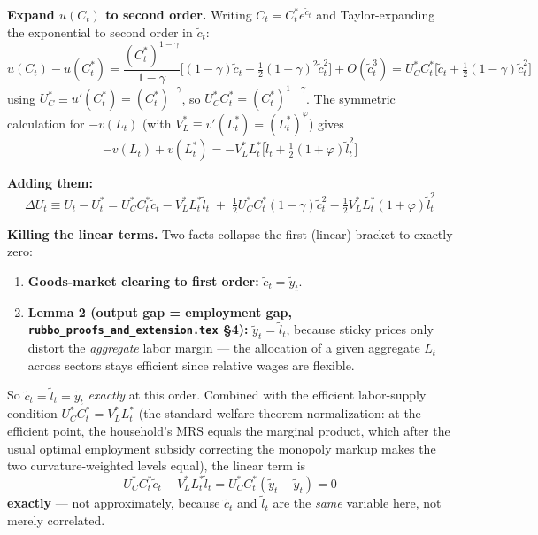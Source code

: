 \documentclass[12pt]{article}
\begin{document}
\textbf{Expand $u(C_t)$ to second order.} Writing $C_t = C_t^* e^{\tilde c_t}$ and Taylor-expanding
the exponential to second order in $\tilde c_t$:
\begin{equation}
    u(C_t) - u(C_t^*) = \frac{(C_t^*)^{1-\gamma}}{1-\gamma}\Big[(1-\gamma)\tilde c_t + \tfrac{1}{2}(1-\gamma)^2\tilde c_t^2\Big] + O(\tilde c_t^3)
    = U_C^*C_t^*\Big[\tilde c_t + \tfrac{1}{2}(1-\gamma)\tilde c_t^2\Big]
\end{equation}
using $U_C^* \equiv u'(C_t^*) = (C_t^*)^{-\gamma}$, so $U_C^*C_t^* = (C_t^*)^{1-\gamma}$. The
symmetric calculation for $-v(L_t)$ (with $V_L^* \equiv v'(L_t^*) = (L_t^*)^\varphi$) gives
\begin{equation}
    -v(L_t) + v(L_t^*) = -V_L^*L_t^*\Big[\tilde l_t + \tfrac{1}{2}(1+\varphi)\tilde l_t^2\Big]
\end{equation}

\textbf{Adding them:}
\begin{equation}
    \Delta U_t \equiv U_t - U_t^* = U_C^*C_t^*\tilde c_t - V_L^*L_t^*\tilde l_t
    \;+\; \tfrac{1}{2}U_C^*C_t^*(1-\gamma)\tilde c_t^2 - \tfrac{1}{2}V_L^*L_t^*(1+\varphi)\tilde l_t^2
    \label{eq:deltaU}
\end{equation}

\textbf{Killing the linear terms.} Two facts collapse the first (linear) bracket to exactly zero:
\begin{enumerate}[label=(\roman*)]
    \item \textbf{Goods-market clearing to first order:} $\tilde c_t = \tilde y_t$.
    \item \textbf{Lemma 2 (output gap = employment gap, \texttt{rubbo\_proofs\_and\_extension.tex} \S4):} $\tilde y_t = \tilde l_t$, because sticky prices only distort the \emph{aggregate} labor margin — the allocation of a given aggregate $L_t$ across sectors stays efficient since relative wages are flexible.
\end{enumerate}
So $\tilde c_t = \tilde l_t = \tilde y_t$ \emph{exactly} at this order. Combined with the efficient
labor-supply condition $U_C^*C_t^* = V_L^*L_t^*$ (the standard welfare-theorem normalization: at the
efficient point, the household's MRS equals the marginal product, which after the usual optimal
employment subsidy correcting the monopoly markup makes the two curvature-weighted levels equal),
the linear term is
\begin{equation}
    U_C^*C_t^*\tilde c_t - V_L^*L_t^*\tilde l_t = U_C^*C_t^*(\tilde y_t - \tilde y_t) = 0
\end{equation}
\textbf{exactly} — not approximately, because $\tilde c_t$ and $\tilde l_t$ are the \emph{same}
variable here, not merely correlated.
\end{document}
